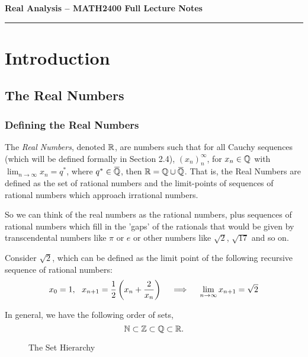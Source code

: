 \documentclass[12pt]{article}
\theoremstyle{definition}
\newcommand{\Overbar}[1]{\mkern 1.5mu\overline{\mkern-1.5mu#1\mkern-1.5mu}\mkern 1.5mu}
\begin{document}
\thispagestyle{contents}
\begin{center}
    \centerline{\large{\textbf{Real Analysis -- MATH2400 Full Lecture Notes}}}
\end{center}

\hrule

\tableofcontents

\newpage

\section{Introduction}
   \subsection{The Real Numbers}
   \subsubsection{Defining the Real Numbers}
    The \textit{Real Numbers}, denoted $\R$, are numbers such that for all Cauchy sequences (which will be defined formally in Section 2.4), $(x_{n})_{n}^{\infty}$, for $x_{n} \in \mathbb{Q}$ with $\lim_{n \rightarrow \infty}x_{n} = q^{\ast}$, where $q^{\ast} \in \Overbar{\Q}$, then $\R = \Q \cup \Overbar{\Q}$. 
    That is, the Real Numbers are defined as the set of rational numbers and the limit-points of sequences of rational numbers which approach irrational numbers. 

    \begin{remark}
        So we can think of the real numbers as the rational numbers, plus sequences of rational numbers which fill in the 'gaps' of the rationals that would be given by transcendental numbers like $\pi$ or $e$ or other numbers like $\sqrt{2}$, $\sqrt{17}$ and so on.
    \end{remark}
    \begin{eg}
        Consider $\sqrt{2}$, which can be defined as the limit point of the following recursive sequence of rational numbers: 
        \begin{equation*}
            x_{0} = 1, ~~ x_{n + 1} = \frac{1}{2}\left(x_{n} + \frac{2}{x_{n}}\right) \quad \implies \quad \lim_{n \rightarrow \infty}x_{n + 1} = \sqrt{2}
        \end{equation*}
    \end{eg}

    In general, we have the following order of sets,
    \begin{equation*}
            \N \subset \Z \subset \Q \subset \R.
    \end{equation*} 
    \begin{figure}[H]
        \centering
        \caption{The Set Hierarchy}
    \end{figure}
\end{document}

